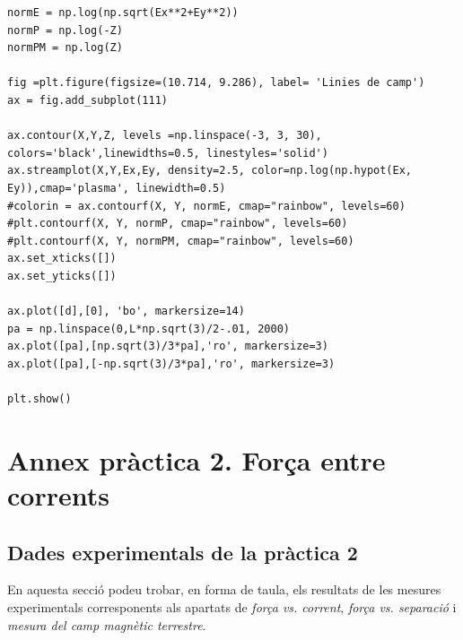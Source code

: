 \documentclass[a4paper,10.5pt]{report}
\begin{document}
\begin{appendices}
\begin{lstlisting}
normE = np.log(np.sqrt(Ex**2+Ey**2))
normP = np.log(-Z)
normPM = np.log(Z)

fig =plt.figure(figsize=(10.714, 9.286), label= 'Linies de camp') 
ax = fig.add_subplot(111)

ax.contour(X,Y,Z, levels =np.linspace(-3, 3, 30), colors='black',linewidths=0.5, linestyles='solid')
ax.streamplot(X,Y,Ex,Ey, density=2.5, color=np.log(np.hypot(Ex, Ey)),cmap='plasma', linewidth=0.5)
#colorin = ax.contourf(X, Y, normE, cmap="rainbow", levels=60)
#plt.contourf(X, Y, normP, cmap="rainbow", levels=60)
#plt.contourf(X, Y, normPM, cmap="rainbow", levels=60)
ax.set_xticks([])
ax.set_yticks([])

ax.plot([d],[0], 'bo', markersize=14)
pa = np.linspace(0,L*np.sqrt(3)/2-.01, 2000)
ax.plot([pa],[np.sqrt(3)/3*pa],'ro', markersize=3)
ax.plot([pa],[-np.sqrt(3)/3*pa],'ro', markersize=3)

plt.show()
\end{lstlisting}

\newpage
\section{Annex pràctica 2. Força entre corrents}
\label{an:c1}
\subsection{Dades experimentals de la pràctica 2}
En aquesta secció podeu trobar, en forma de taula, els resultats de les mesures experimentals corresponents als apartats de \textit{força vs. corrent}, \textit{força vs. separació} i \textit{mesura del camp magnètic terrestre}.


\end{appendices}
\end{document}

